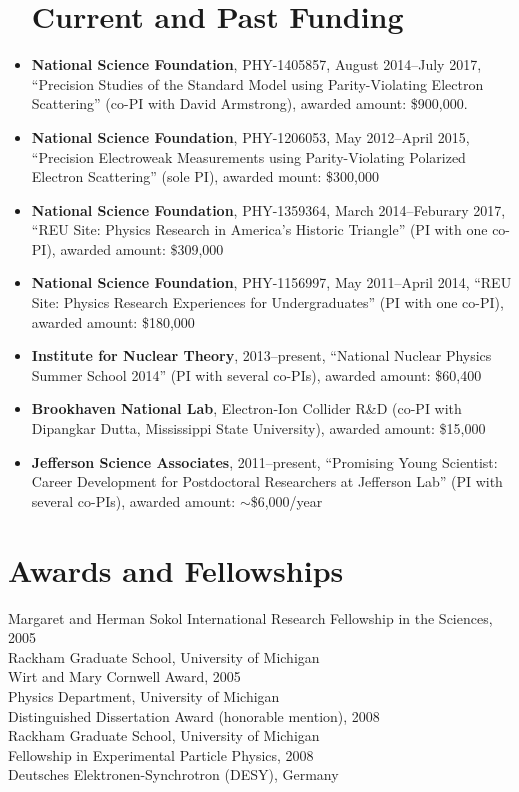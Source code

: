 \documentclass[overlapped,line,final,11pt,letterpaper]{res}
\begin{document}
\begin{resume}
\begin{itemize}
\section{\bf Current and Past Funding}
 \item \textbf{National Science Foundation}, PHY-1405857, August 2014--July 2017, ``Precision Studies of the Standard Model using Parity-Violating Electron Scattering'' (co-PI with David Armstrong), awarded amount: \$900,000.
 \item \textbf{National Science Foundation}, PHY-1206053, May 2012--April 2015, ``Precision Electroweak Measurements using Parity-Violating Polarized Electron Scattering'' (sole PI), awarded mount: \$300,000
 \item \textbf{National Science Foundation}, PHY-1359364, March 2014--Feburary 2017, ``REU Site: Physics Research in America's Historic Triangle'' (PI with one co-PI), awarded amount: \$309,000
  \item \textbf{National Science Foundation}, PHY-1156997, May 2011--April 2014, ``REU Site: Physics Research Experiences for Undergraduates'' (PI with one co-PI), awarded amount: \$180,000
 \item \textbf{Institute for Nuclear Theory}, 2013--present, ``National Nuclear Physics Summer School 2014'' (PI with several co-PIs), awarded amount: \$60,400
 \item \textbf{Brookhaven National Lab}, Electron-Ion Collider R\&D (co-PI with Dipangkar Dutta, Mississippi State University), awarded amount: \$15,000
 \item \textbf{Jefferson Science Associates}, 2011--present, ``Promising Young Scientist: Career Development for Postdoctoral Researchers at Jefferson Lab'' (PI with several co-PIs), awarded amount: $\sim$\$6,000/year
\end{itemize}


\section{\bf Awards and Fellowships}

Margaret and Herman Sokol International Research Fellowship in the Sciences, 2005 \\
Rackham Graduate School, University of Michigan
\vspace{0.5\baselineskip} \\
Wirt and Mary Cornwell Award, 2005 \\
Physics Department, University of Michigan
\vspace{0.5\baselineskip} \\
Distinguished Dissertation Award (honorable mention), 2008 \\
Rackham Graduate School, University of Michigan
\vspace{0.5\baselineskip} \\
Fellowship in Experimental Particle Physics, 2008 \\
Deutsches Elektronen-Synchrotron (DESY), Germany


\end{resume}
\end{document}

